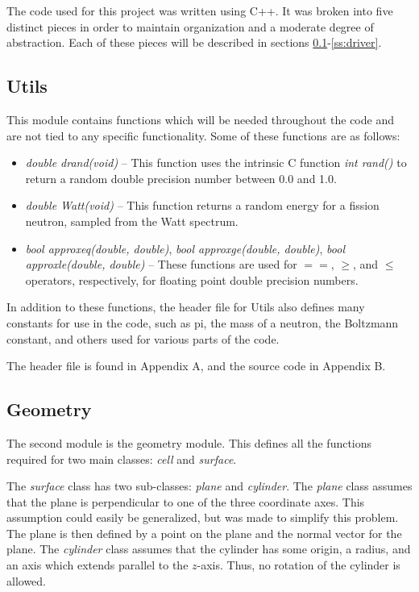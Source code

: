 The code used for this project was written using C++.  It was broken into five distinct pieces in order to maintain organization and a moderate degree of abstraction.  Each of these pieces will be described in sections \ref{ss:utils}-\ref{ss:driver}.

\subsection{Utils}\label{ss:utils}

This module contains functions which will be needed throughout the code and are not tied to any specific functionality.  Some of these functions are as follows:

\begin{itemize}
\item \textit{double drand(void)} -- This function uses the intrinsic C function \textit{int rand()} to return a random double precision number between 0.0 and 1.0.
\item \textit{double Watt(void)} -- This function returns a random energy for a fission neutron, sampled from the Watt spectrum.
\item \textit{bool approxeq(double, double)}, \textit{bool approxge(double, double)}, \textit{bool approxle(double, double)} -- These functions are used for $==$, $\ge$, and $\le$ operators, respectively, for floating point double precision numbers.
\end{itemize}

In addition to these functions, the header file for Utils also defines many constants for use in the code, such as pi, the mass of a neutron, the Boltzmann constant, and others used for various parts of the code.

The header file is found in Appendix A, and the source code in Appendix B.

\subsection{Geometry}\label{ss:geometry}

The second module is the geometry module.  This defines all the functions required for two main classes: \textit{cell} and \textit{surface}.

The \textit{surface} class has two sub-classes: \textit{plane} and \textit{cylinder}.  The \textit{plane} class assumes that the plane is perpendicular to one of the three coordinate axes.  This assumption could easily be generalized, but was made to simplify this problem.  The plane is then defined by a point on the plane and the normal vector for the plane.  The \textit{cylinder} class assumes that the cylinder has some origin, a radius, and an axis which extends parallel to the $z$-axis.  Thus, no rotation of the cylinder is allowed.

